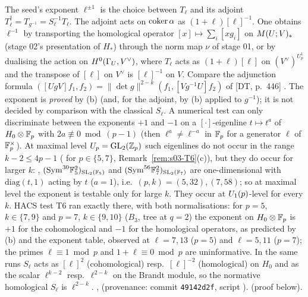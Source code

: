 \begin{remark}\label{rem:s03-pm}
The seed's exponent $\ell^{\pm1}$ is the choice between $T_\ell$ and its adjoint $T_\ell^\dagger=T_{g^{-1}}=S_\ell^{-1}T_\ell$. The
adjoint acts on $\operatorname{coker}\alpha$ as $(1+\ell)[\ell]^{-1}$. One obtains $\ell^{-1}$ by transporting the homological operator
$[x]\mapsto\sum_i[xg_i]$ on $M(U;V)_*$ (stage 02's presentation of $H_*$) through the norm map $\nu$ of stage 01, or by dualising the action on $H^0(\Gamma_U,V^\vee)$, where $T_\ell$ acts as
$(1+\ell)[\ell]$ on $(V^\vee)^{U^1_p}$ and the transpose of $[\ell]$ on $V^\vee$ is $[\ell]^{-1}$ on $V$. Compare the adjunction
formula $([UgV]f_1,f_2)=\|\det g\|^{2-k}(f_1,[Vg^{-1}U]f_2)$ of [DT, p.~446]
. The exponent is \emph{proved} by (b) (and, for the
adjoint, by (b) applied to $g^{-1}$); it is not decided by comparison with the classical $S_\ell$. A numerical test can only discriminate between the
exponents $+1$ and $-1$ on a $[\cdot]$-eigenline $t\mapsto t^a$ of $H_0\otimes\mathbb{F}_p$ with $2a\not\equiv0\bmod(p-1)$ (then $\ell^a\ne\ell^{-a}$ in $\mathbb{F}_p$ for a
generator $\ell$ of $\mathbb{F}_p^\times$). At maximal level $U_p=\mathrm{GL}_2(\mathbb{Z}_p)$ such eigenlines do not occur in the range $k-2\le4p-1$ (\stcomp{} for $p\in\{5,7\}$, Remark~\ref{rem:s03-T6}(c)), but they do occur for larger $k$: \stcomp{}, $(\mathrm{Sym}^{30}\mathbb{F}_5^2)_{\mathrm{SL}_2(\mathbb{F}_5)}$ and $(\mathrm{Sym}^{56}\mathbb{F}_7^2)_{\mathrm{SL}_2(\mathbb{F}_7)}$ are one-dimensional with $\mathrm{diag}(t,1)$ acting by $t$ ($a=1$), i.e.\ $(p,k)=(5,32),(7,58)$; so at maximal level the exponent is testable only for large $k$. They occur at $U_1(p)$-level for every $k$. HACS test T6 ran exactly there, with both
normalisations: for $p=5$, $k\in\{7,9\}$ and $p=7$, $k\in\{9,10\}$ ($B_3$, tree at $q=2$) the exponent on $H_0\otimes\mathbb{F}_p$ is $+1$ for the cohomological and $-1$ for the homological
operators, as predicted by (b) and the exponent table, observed at $\ell=7,13$ ($p=5$) and $\ell=5,11$ ($p=7$); the primes $\ell\equiv1\bmod p$ and $1+\ell\equiv0\bmod p$
are uninformative. In the same runs $S_\ell$ acts as $[\ell]^2$ (cohomological) resp.\ $[\ell]^{-2}$ (homological) on $H_0$ and as the scalar $\ell^{k-2}$ resp.\ $\ell^{2-k}$ on the
Brandt module, so the normative homological $S_\ell$ is $\ell^{2-k}$. \stcomp{},  (provenance: commit \texttt{49142d2f}, script
).
\stproved{} (proof below).
\end{remark}
